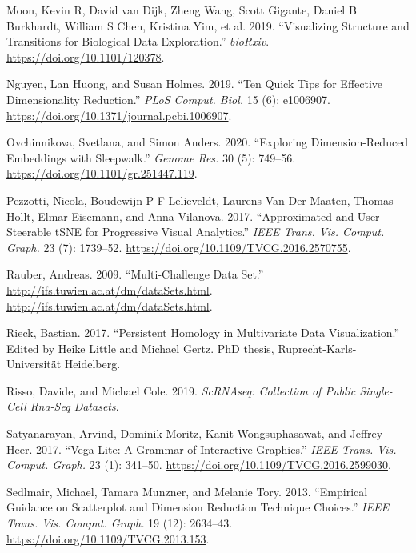 \documentclass[article,notitle]{jdssv}
\begin{document}
\leavevmode\hypertarget{ref-Moon2019-ce}{}%
Moon, Kevin R, David van Dijk, Zheng Wang, Scott Gigante, Daniel B Burkhardt, William S Chen, Kristina Yim, et al. 2019. ``Visualizing Structure and Transitions for Biological Data Exploration.'' \emph{bioRxiv}. \url{https://doi.org/10.1101/120378}.

\leavevmode\hypertarget{ref-Nguyen2019-yh}{}%
Nguyen, Lan Huong, and Susan Holmes. 2019. ``Ten Quick Tips for Effective Dimensionality Reduction.'' \emph{PLoS Comput. Biol.} 15 (6): e1006907. \url{https://doi.org/10.1371/journal.pcbi.1006907}.

\leavevmode\hypertarget{ref-Ovchinnikova2020-sy}{}%
Ovchinnikova, Svetlana, and Simon Anders. 2020. ``Exploring Dimension-Reduced Embeddings with Sleepwalk.'' \emph{Genome Res.} 30 (5): 749--56. \url{https://doi.org/10.1101/gr.251447.119}.

\leavevmode\hypertarget{ref-Pezzotti2017-cz}{}%
Pezzotti, Nicola, Boudewijn P F Lelieveldt, Laurens Van Der Maaten, Thomas Hollt, Elmar Eisemann, and Anna Vilanova. 2017. ``Approximated and User Steerable tSNE for Progressive Visual Analytics.'' \emph{IEEE Trans. Vis. Comput. Graph.} 23 (7): 1739--52. \url{https://doi.org/10.1109/TVCG.2016.2570755}.

\leavevmode\hypertarget{ref-Rauber2009-vh}{}%
Rauber, Andreas. 2009. ``Multi-Challenge Data Set.'' \url{http://ifs.tuwien.ac.at/dm/dataSets.html}. \url{http://ifs.tuwien.ac.at/dm/dataSets.html}.

\leavevmode\hypertarget{ref-Rieck2017-kk}{}%
Rieck, Bastian. 2017. ``Persistent Homology in Multivariate Data Visualization.'' Edited by Heike Little and Michael Gertz. PhD thesis, Ruprecht-Karls-Universität Heidelberg.

\leavevmode\hypertarget{ref-scRNAseq-d}{}%
Risso, Davide, and Michael Cole. 2019. \emph{ScRNAseq: Collection of Public Single-Cell Rna-Seq Datasets}.

\leavevmode\hypertarget{ref-Satyanarayan2017-gs}{}%
Satyanarayan, Arvind, Dominik Moritz, Kanit Wongsuphasawat, and Jeffrey Heer. 2017. ``Vega-Lite: A Grammar of Interactive Graphics.'' \emph{IEEE Trans. Vis. Comput. Graph.} 23 (1): 341--50. \url{https://doi.org/10.1109/TVCG.2016.2599030}.

\leavevmode\hypertarget{ref-Sedlmair2013-pn}{}%
Sedlmair, Michael, Tamara Munzner, and Melanie Tory. 2013. ``Empirical Guidance on Scatterplot and Dimension Reduction Technique Choices.'' \emph{IEEE Trans. Vis. Comput. Graph.} 19 (12): 2634--43. \url{https://doi.org/10.1109/TVCG.2013.153}.
\end{document}
